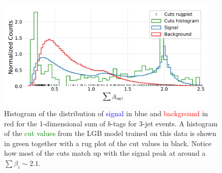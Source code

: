 \begin{figure}
  \includegraphics[width=0.95\textwidth, trim=10 10 10 20, clip]{figures/quarks/gtag_sum_method_njet=3-down_sample=1.00-ML_vars=vertex-selection=b-ejet_min=4-n_iter_RS_lgb=99-n_iter_RS_xgb=9-cdot_cut=0.90-version=19.pdf}
  \caption[1D LGB Model Cuts for 3-jets events]
          {Histogram of the distribution of \textcolor{blue}{signal} in blue and \textcolor{red}{background} in red for the 1-dimensional sum of $b$-tags for 3-jet events. A histogram of the \textcolor{green}{cut values} from the LGB model trained on this data is shown in green together with a rug plot of the cut values in black. Notice how most of the cuts match up with the signal peak at around a $\sum \beta_i \sim 2.1$.
          } 
  \label{fig:q:1d_sum_model_cuts_3j}
\end{figure}

